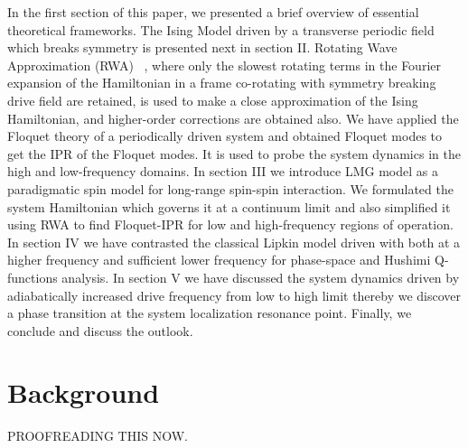 \documentclass[%
 reprint,
superscriptaddress,
 amsmath,amssymb,
 aps,
prb,
]{revtex4-2}
\begin{document}
In the first section of this paper, we presented a brief overview of essential theoretical frameworks. The Ising Model driven by a transverse periodic field which breaks symmetry is presented next in section II. Rotating Wave Approximation (RWA) ~\cite{fujii_introduction_2017}, where only the slowest rotating terms in the Fourier expansion of the Hamiltonian in a frame co-rotating with symmetry breaking drive field are retained, is used to make a close approximation of the Ising Hamiltonian, and higher-order corrections are obtained also. We have applied the Floquet theory of a periodically driven system and obtained Floquet modes to get the IPR of the Floquet modes. It is used to probe the system dynamics in the high and low-frequency domains. In section III we introduce  LMG model as a paradigmatic spin model for long-range spin-spin interaction. We formulated the system Hamiltonian which governs it at a continuum limit and also simplified it using RWA to find Floquet-IPR for low and high-frequency regions of operation. In section IV we have contrasted the classical Lipkin model driven with both at a higher frequency and sufficient lower frequency for phase-space and Hushimi Q-functions analysis. In section V we have discussed the  system dynamics driven by adiabatically increased drive frequency from low to high limit thereby we discover a phase transition at the system localization resonance point. Finally, we conclude and discuss the outlook. 

\section{\label{sec:background} Background}

PROOFREADING THIS NOW.
\end{document}
